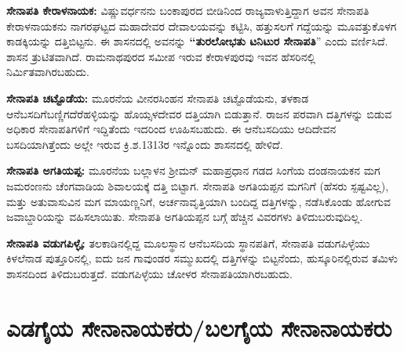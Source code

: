 \vskip 4pt

\textbf{ಸೇನಾಪತಿ ಕೇರಾಳನಾಯಕ:} ವಿಷ್ಣುವರ್ಧನನು ಬಂಕಾಪುರದ ಬೀಡಿನಿಂದ ರಾಜ್ಯವಾಳುತ್ತಿದ್ದಾಗ ಅವನ ಸೇನಾಪತಿ ಕೇರಾಳನಾಯಕನು ನಾಗರಘಟ್ಟದ ಮಹಾದೇವರ ದೇವಾಲಯವನ್ನು ಕಟ್ಟಿಸಿ, ಹತ್ತುಸಲಗೆ ಗದ್ದೆಯನ್ನು ಮೂವತ್ತುಕೊಳಗ ಕಾಡಕ್ಕಿಯನ್ನು ದತ್ತಿಬಿಟ್ಟನು. ಈ ಶಾಸನದಲ್ಲಿ ಅವನನ್ನು \textbf{“ತುರಲೋಭತು ಟನಿಟುರ ಸೇನಾಪತಿ}” ಎಂದು ವರ್ಣಿಸಿದೆ. ಶಾಸನ ತ್ರುಟಿತವಾಗಿದೆ. ರಾಮನಾಥಪುರದ ಸಮೀಪ ಇರುವ ಕೇರಾಳಪುರವು ಇವನ ಹೆಸರಿನಲ್ಲಿ ನಿರ್ಮಿತವಾಗಿರಬಹುದು.

\vskip 2pt

\textbf{ಸೇನಾಪತಿ ಚಟ್ಟೊಡೆಯ:} ಮೂರನೆಯ ವೀನರಸಿಂಹನ ಸೇನಾಪತಿ ಚಟ್ಟೊಡೆಯನು, ತಳಕಾಡ ಆನೆಬಸದಿಗೆ\break ಬಣ್ಣಿಗದೆರೆಹಳ್ಳಿಯನ್ನು ಹೊಯ್ಸಳದೇವರ ದತ್ತಿಯಾಗಿ ಬಿಡುತ್ತಾನೆ. ರಾಜನ ಪರವಾಗಿ ದತ್ತಿಗಳನ್ನು ಬಿಡುವ ಅಧಿಕಾರ ಸೇನಾಪತಿಗಳಿಗೆ ಇದ್ದಿತೆಂದು ಇದರಿಂದ ಊಹಿಸಬಹುದು. ಈ ಆನೆಬಸದಿಯು ಆದಿದೇವನ ಬಸದಿಯಾಗಿತ್ತೆಂದು ಅಲ್ಲೇ ಇರುವ ಕ್ರಿ.ಶ.1313ರ ಇನ್ನೊಂದು ಶಾಸನದಲ್ಲಿ ಹೇಳಿದೆ.

\vskip 2pt

\textbf{ಸೇನಾಪತಿ ಅಗತಿಯಪ್ಪ:} ಮೂರನೆಯ ಬಲ್ಲಾಳನ ಶ‍್ರೀಮನ್​ ಮಹಾಪ್ರಧಾನ ಗಡದ ಸಿಂಗೆಯ ದಂಡನಾಯಕನ ಮಗ ಜಮರಂಣನು ಚೆಂಗವಾಡಿಯ ಶಿವಾಲಯಕ್ಕೆ ದತ್ತಿ ಬಿಟ್ಟಾಗ. ಸೇನಾಪತಿ ಅಗತಿಯಪ್ಪನ ಮಗನಿಗೆ (ಹೆಸರು ಸ್ಪಷ್ಟವಿಲ್ಲ), ಮತ್ತು ಅತುವಾಸುವಿನ ಮಗ ಮಾಯಣ್ಣನಿಗೆ, ಅರ್ಚನಾವೃತ್ತಿಯಾಗಿ ಬಂದಿದ್ದ ದತ್ತಿಗಳನ್ನು, ನಡೆಸಿಕೊಂಡು ಹೋಗುವ ಜವಾಬ್ದಾರಿಯನ್ನು ವಹಿಸಲಾಯಿತು. ಸೇನಾಪತಿ ಅಗತಿಯಪ್ಪನ ಬಗ್ಗೆ ಹೆಚ್ಚಿನ ವಿವರಗಳು ತಿಳಿದುಬರುವುದಿಲ್ಲ.

\vskip 2pt

\textbf{ಸೇನಾಪತಿ ವಡುಗಪಿಳ್ಳೈ:} ತಲಕಾಡಿನಲ್ಲಿದ್ದ ಮೂಲಸ್ಥಾನ ಆನೆಬಸದಿಯ ಸ್ಥಾನಪತಿಗೆ, ಸೇನಾಪತಿ ವಡುಗಪಿಳ್ಳೆಯು ಕಿಳಲೆನಾಡ ಪುತ್ತೂರಿನಲ್ಲಿ, ಐದು ಜನ ಗಾವುಂಡರ ಸಮ್ಮುಖದಲ್ಲಿ ದತ್ತಿಗಳನ್ನು ಬಿಟ್ಟನೆಂದು, ಹುಸ್ಕೂರಿನಲ್ಲಿರುವ ತಮಿಳು ಶಾಸನದಿಂದ ತಿಳಿದುಬರುತ್ತದೆ. ವಡುಗಪಿಳ್ಳೆಯು ಚೋಳರ ಸೇನಾಪತಿಯಾಗಿರಬಹುದು.


\section*{ಎಡಗೈಯ ಸೇನಾನಾಯಕರು/ಬಲಗೈಯ ಸೇನಾನಾಯಕರು}

